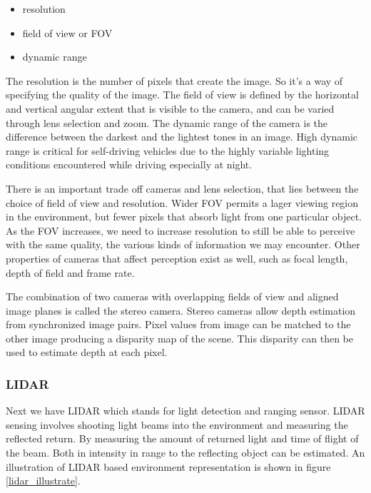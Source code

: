 \begin{itemize}
\item resolution
\item field of view or FOV
\item dynamic range
\end{itemize}

The resolution is the number of pixels that create the image. So it's a way of specifying
the quality of the image.  The field of view is defined by the horizontal and vertical angular extent that is visible to the camera, and can be
varied through lens selection and zoom. The dynamic range of the camera is the difference between the darkest and the lightest tones in an image. High dynamic range is critical for
self-driving vehicles due to the highly variable lighting conditions encountered
while driving especially at night. 

There is an important trade off cameras and lens selection, that lies between the choice of
field of view and resolution. Wider FOV permits a lager
viewing region in the environment, but fewer pixels that absorb light from one particular object. As the FOV increases, we need to increase resolution to still be
able to perceive with the same quality, the various kinds of information we may encounter. 
Other properties of cameras that affect perception exist as well, such as focal length, depth of field and frame rate. 
 
The combination of two cameras with overlapping fields of view and aligned image planes is
called the stereo camera. Stereo cameras allow depth estimation
from synchronized image pairs. Pixel values from image can be
matched to the other image producing a disparity map of the scene. This disparity can then be used
to estimate depth at each pixel. 

\subsubsection{LIDAR}

Next we have LIDAR which stands for light detection and ranging sensor. LIDAR sensing involves shooting
light beams into the environment and measuring the reflected return. By measuring the amount of returned
light and time of flight of the beam. Both in intensity in range to
the reflecting object can be estimated. An illustration of LIDAR based environment representation is shown in figure \ref{lidar_illustrate}.

